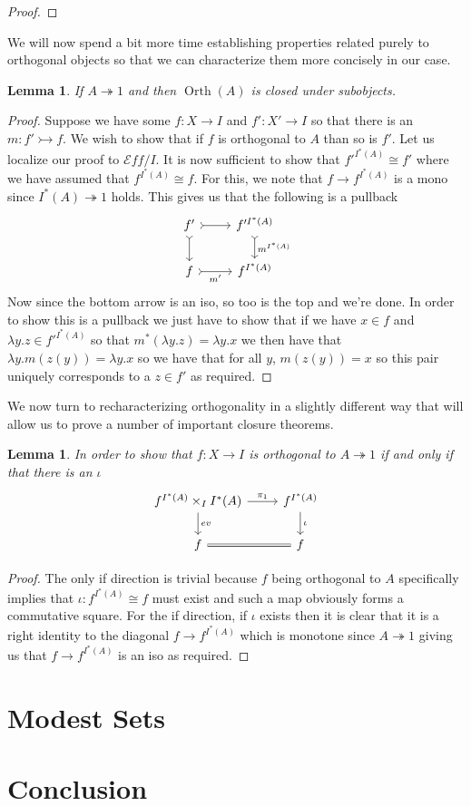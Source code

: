 \documentclass[12pt]{amsart}
\newcommand{\todo}[1]{{\color{red}{\LARGE #1}}}
\newcommand{\eff}{\mathcal{E}\!f\!f}
\newcommand{\epi}{\ensuremath{\twoheadrightarrow}}
\newcommand{\mono}{\ensuremath{\rightarrowtail}}
\DeclareMathOperator{\orth}{Orth}
\newtheorem{lem}[thm]{Lemma}
\begin{document}
\begin{proof}
  \todo{Essentially this means showing that products and equalizers
    preserve orthogonality, $\Pi$ restricts, and pullbacks preserve
    orthogonality}
\end{proof}
We will now spend a bit more time establishing properties related
purely to orthogonal objects so that we can characterize them more
concisely in our case.
\begin{lem}\label{lem:orth:orthsubobjects}
  If $A \epi 1$ and then $\orth(A)$ is closed under subobjects.
\end{lem}
\begin{proof}
  Suppose we have some $f : X \to I$ and $f' : X' \to I$ so that there
  is an $m : f' \mono f$. We wish to show that if $f$ is orthogonal to
  $A$ than so is $f'$. Let us localize our proof to $\eff/I$. It is
  now sufficient to show that $f'^{I^*(A)} \cong f'$ where we have
  assumed that $f^{I^*(A)} \cong f$. For this, we note that
  $f \to f^{I^*(A)}$ is a mono since $I^*(A) \epi 1$ holds. This gives
  us that the following is a pullback
  \[
    \begin{tikzcd}
      f' \ar[d, rightarrowtail] \ar[r, rightarrowtail] & {f'^{I^*(A)}} \ar[d, rightarrowtail, "m^{I^*(A)}"]\\
      f \ar[r, rightarrowtail, swap, "m'"] & {f^{I^*(A)}}
    \end{tikzcd}
  \]
  Now since the bottom arrow is an iso, so too is the top and we're
  done. In order to show this is a pullback we just have to show that
  if we have $x \in f$ and $\lambda y. z \in f'^{I^*(A)}$ so that
  $m^*(\lambda y. z) = \lambda y. x$ we then have that
  $\lambda y. m(z(y)) = \lambda y. x$ so we have that for all $y$,
  $m(z(y)) = x$ so this pair uniquely corresponds to a $z \in f'$ as
  required.
\end{proof}
We now turn to recharacterizing orthogonality in a slightly different
way that will allow us to prove a number of important closure
theorems.
\begin{lem}\label{lem:orth:orthpushout}
  In order to show that $f : X \to I$ is orthogonal to $A \epi 1$ if
  and only if that there is an $\iota$
  \[
    \begin{tikzcd}
      f^{I^*(A)} \times_I I^*(A) \ar[r, "\pi_1"] \ar[d, "ev"] & f^{I^*(A)} \ar[d, "\iota"]\\
      f \ar[r, equals] & f
    \end{tikzcd}
  \]
\end{lem}
\begin{proof}
  The only if direction is trivial because $f$ being orthogonal to $A$
  specifically implies that $\iota : f^{I^*(A)} \cong f$ must exist
  and such a map obviously forms a commutative square. For the if
  direction, if $\iota$ exists then it is clear that it is a right
  identity to the diagonal $f \to f^{I^*(A)}$ which is monotone since
  $A \epi 1$ giving us that $f \to f^{I^*(A)}$ is an iso as required.
\end{proof}

\section{Modest Sets}\label{sec:modest}
\section{Conclusion}\label{sec:conclusion}


{}
\end{document}
